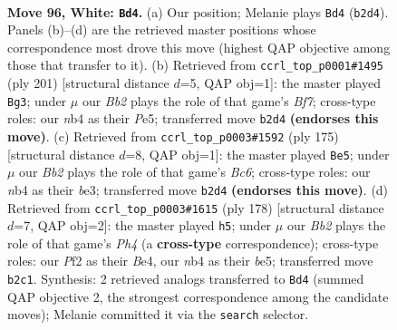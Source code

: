 \documentclass[11pt]{article}
\begin{document}
\clearpage

\begin{figure}[p]\centering
\begin{subfigure}{0.46\textwidth}\centering
\resizebox{\linewidth}{!}{%
\newchessgame
\chessboard[
  setfen={8/7k/8/8/1n3K2/8/1B3P2/3b4 w - - 37 96},
  showmover=false,
  pgfstyle=straightmove, color=movearrow, markmove={b2-d4}
]}
\caption{}
\end{subfigure}\hfill
\begin{subfigure}{0.46\textwidth}\centering
\resizebox{\linewidth}{!}{%
\newchessgame
\chessboard[
  setfen={4k3/8/8/4p3/8/5P2/B2K1b2/8 b - - 24 101},
  showmover=false,
  pgfstyle=straightmove, color=movearrow, markmove={f2-g3}
]}
\caption{}
\end{subfigure}
\\[4pt]
\begin{subfigure}{0.46\textwidth}\centering
\resizebox{\linewidth}{!}{%
\newchessgame
\chessboard[
  setfen={7k/8/6K1/8/2B1p3/2b1B3/8/8 b - - 37 88},
  showmover=false,
  pgfstyle=straightmove, color=movearrow, markmove={c3-e5}
]}
\caption{}
\end{subfigure}\hfill
\begin{subfigure}{0.46\textwidth}\centering
\resizebox{\linewidth}{!}{%
\newchessgame
\chessboard[
  setfen={8/4k3/2K5/4b3/2b1B2P/8/8/8 w - - 0 90},
  showmover=false,
  pgfstyle=straightmove, color=movearrow, markmove={h4-h5}
]}
\caption{}
\end{subfigure}
\caption{\textbf{Move 96, White: \texttt{Bd4}.} (a) Our position; Melanie plays \texttt{Bd4} (\texttt{b2d4}). Panels (b)--(d) are the retrieved master positions whose correspondence most drove this move (highest QAP objective among those that transfer to it). (b) Retrieved from \texttt{ccrl\_top\_p0001\#1495} (ply 201) [structural distance $d$=5, QAP obj=1]: the master played \texttt{Bg3}; under $\mu$ our \emph{Bb2} plays the role of that game's \emph{Bf7}; cross-type roles: our \emph{n}b4 as their \emph{P}e5; transferred move \texttt{b2d4} \textbf{(endorses this move)}. (c) Retrieved from \texttt{ccrl\_top\_p0003\#1592} (ply 175) [structural distance $d$=8, QAP obj=1]: the master played \texttt{Be5}; under $\mu$ our \emph{Bb2} plays the role of that game's \emph{Bc6}; cross-type roles: our \emph{n}b4 as their \emph{b}e3; transferred move \texttt{b2d4} \textbf{(endorses this move)}. (d) Retrieved from \texttt{ccrl\_top\_p0003\#1615} (ply 178) [structural distance $d$=7, QAP obj=2]: the master played \texttt{h5}; under $\mu$ our \emph{Bb2} plays the role of that game's \emph{Ph4} (a \textbf{cross-type} correspondence); cross-type roles: our \emph{P}f2 as their \emph{B}e4, our \emph{n}b4 as their \emph{b}e5; transferred move \texttt{b2c1}. Synthesis: 2 retrieved analogs transferred to \texttt{Bd4} (summed QAP objective 2, the strongest correspondence among the candidate moves); Melanie committed it via the \texttt{search} selector.}
\label{fig:thought-m190}
\end{figure}
\end{document}
